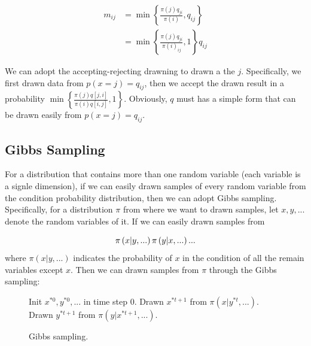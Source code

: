 \documentclass[runningheads,openany]{xhlPaper}
\begin{document}
\begin{displaymath}
\label{equ:metropolis_hastings_sampling_acept_rejecting}
\begin{aligned}
{m_{ij}} &= \min \left\{ {\frac{{\pi \left( j \right){q_{ji}}}}{{\pi \left( i \right)}},{q_{ij}}} \right\}\\
 &= \min \left\{ {\frac{{\pi \left( j \right){q_{ji}}}}{{\pi {{\left( i \right)}_{ij}}}},1} \right\}{q_{ij}}
\end{aligned}
\end{displaymath}

We can adopt the accepting-rejecting drawning to drawn a the $j$. 
Specifically, we first drawn data from $p\left( {x = j} \right) = {q_{ij}}$, then we accept the drawn result in a probability $\min \left\{ {\frac{{\pi \left( j \right)q\left[ {j,i} \right]}}{{\pi \left( i \right)q\left[ {i,j} \right]}},1} \right\}$.
Obviously, $q$ must has a simple form that can be drawn easily from $p\left( {x = j} \right) = {q_{ij}}$.

\subsection{Gibbs Sampling}
For a distribution that contains more than one random variable (each variable is a signle dimension), if we can easily drawn samples of every random variable from the condition probability distribution, then we can adopt Gibbs sampling.
Specifically, for a distribution $\pi$ from where we want to drawn samples, let $x, y, ...$ denote the random variables of it.
If we can easily drawn samples from 

\begin{displaymath}
\pi \left( {x|y,...} \right)\\
\pi \left( {y|x,...} \right)\\
...
\end{displaymath}
where $\pi \left( {x|y,...} \right)$ indicates the probability of $x$ in the condition of all the remain variables except $x$. 
Then we can drawn samples from $\pi$ through the Gibbs sampling:

\begin{figure}
\caption{Gibbs sampling.}
\centering
\label{fig:gibbs_sampling}
\begin{algorithmic}
\STATE Init $x^{*0}, y^{*0}, ...$ in time step $0$.
\LOOP 
\STATE Drawn $x^{*t + 1}$ from $\pi \left( {x|y^{*t},...} \right)$.
\STATE Drawn $y^{*t + 1}$ from $\pi \left( {y|x^{*t + 1},...} \right)$.
\ENDLOOP
\end{algorithmic}
\end{figure}
\end{document}

